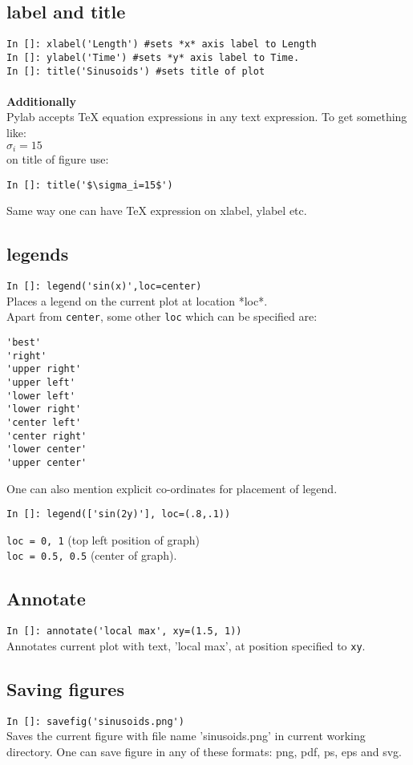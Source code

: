 \documentclass[12pt]{article}
\newcommand{\typ}[1]{\lstinline{#1}}
\begin{document}
\subsection{label and title}
\typ{In []: xlabel('Length') #sets *x* axis label to Length}\\ 
\typ{In []: ylabel('Time') #sets *y* axis label to Time.}\\
\typ{In []: title('Sinusoids') #sets title of plot}\\
\\
\textbf{Additionally}\\
Pylab accepts TeX equation expressions in any text expression. To get something like:\\
$\sigma_i=15$ \\
on title of figure use: 
\begin{lstlisting}
In []: title('$\sigma_i=15$')
\end{lstlisting}  
Same way one can have TeX expression on xlabel, ylabel etc.

\subsection{legends}
\typ{In []: legend('sin(x)',loc=center)} \\
Places a legend on the current plot at location *loc*.\\
Apart from \typ{center}, some other \typ{loc} which can be specified are:
\begin{lstlisting}
'best'
'right'
'upper right'
'upper left'      
'lower left'      
'lower right'     
'center left'     
'center right'    
'lower center'    
'upper center'    
\end{lstlisting}
\newpage
One can also mention explicit co-ordinates for placement of legend. 
\begin{lstlisting}
In []: legend(['sin(2y)'], loc=(.8,.1)) 
\end{lstlisting}
\typ{loc = 0, 1} (top left position of graph)\\
\typ{loc = 0.5, 0.5} (center of graph).

\subsection{Annotate}
\typ{In []: annotate('local max', xy=(1.5, 1))}\\
Annotates current plot with text, 'local max', at position specified to \typ{xy}.

\subsection{Saving figures}
\typ{In []: savefig('sinusoids.png')}\\
Saves the current figure with file name 'sinusoids.png' in current working directory. One can save figure in any of these formats: png, pdf, ps, eps and svg.
\end{document}
